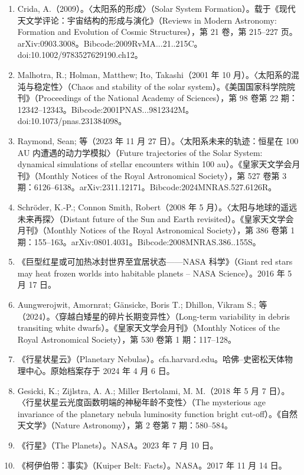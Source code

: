 \begin{enumerate}
\item Crida, A.（2009）。〈太阳系的形成〉（Solar System Formation）。载于《现代天文学评论：宇宙结构的形成与演化》（Reviews in Modern Astronomy: Formation and Evolution of Cosmic Structures），第 21 卷，第 215–227 页。arXiv:0903.3008。Bibcode:2009RvMA...21..215C。doi:10.1002/9783527629190.ch12。
\item Malhotra, R.; Holman, Matthew; Ito, Takashi（2001 年 10 月）。〈太阳系的混沌与稳定性〉（Chaos and stability of the solar system）。《美国国家科学院院刊》（Proceedings of the National Academy of Sciences），第 98 卷第 22 期：12342–12343。Bibcode:2001PNAS...9812342M。doi:10.1073/pnas.231384098。
\item Raymond, Sean; 等（2023 年 11 月 27 日）。〈太阳系未来的轨迹：恒星在 100 AU 内遭遇的动力学模拟〉（Future trajectories of the Solar System: dynamical simulations of stellar encounters within 100 au）。《皇家天文学会月刊》（Monthly Notices of the Royal Astronomical Society），第 527 卷第 3 期：6126–6138。arXiv:2311.12171。Bibcode:2024MNRAS.527.6126R。
\item Schröder, K.-P.; Connon Smith, Robert（2008 年 5 月）。〈太阳与地球的遥远未来再探〉（Distant future of the Sun and Earth revisited）。《皇家天文学会月刊》（Monthly Notices of the Royal Astronomical Society），第 386 卷第 1 期：155–163。arXiv:0801.4031。Bibcode:2008MNRAS.386..155S。
\item 《巨型红星或可加热冰封世界至宜居状态——NASA 科学》（Giant red stars may heat frozen worlds into habitable planets – NASA Science）。2016 年 5 月 17 日。
\item Aungwerojwit, Amornrat; Gänsicke, Boris T.; Dhillon, Vikram S.; 等（2024）。〈穿越白矮星的碎片长期变异性〉（Long-term variability in debris transiting white dwarfs）。《皇家天文学会月刊》（Monthly Notices of the Royal Astronomical Society），第 530 卷第 1 期：117–128。
\item 《行星状星云》（Planetary Nebulas）。cfa.harvard.edu。哈佛–史密松天体物理中心。原始档案存于 2024 年 4 月 6 日。
\item Gesicki, K.; Zijlstra, A. A.; Miller Bertolami, M. M.（2018 年 5 月 7 日）。〈行星状星云光度函数明端的神秘年龄不变性〉（The mysterious age invariance of the planetary nebula luminosity function bright cut-off）。《自然天文学》（Nature Astronomy），第 2 卷第 7 期：580–584。
\item 《行星》（The Planets）。NASA。2023 年 7 月 10 日。
\item 《柯伊伯带：事实》（Kuiper Belt: Facts）。NASA。2017 年 11 月 14 日。

\end{enumerate}
